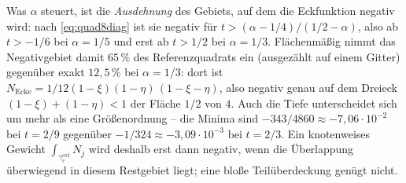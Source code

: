 \documentclass[a4paper,11pt]{article}
\def\tfrac#1#2{#1/#2}%
\def\tilde#1{#1}%
\begin{document}
Was $\alpha$ steuert, ist die \emph{Ausdehnung} des Gebiets, auf dem die Eckfunktion negativ wird:
nach \eqref{eq:quad8diag} ist sie negativ für $t>(\alpha-\tfrac14)/(\tfrac12-\alpha)$, also ab
$t>-\tfrac16$ bei $\alpha=\tfrac15$ und erst ab $t>\tfrac12$ bei $\alpha=\tfrac13$. Flächenmäßig
nimmt das Negativgebiet damit $65\,\%$ des Referenzquadrats ein (ausgezählt auf einem Gitter)
gegenüber exakt $12{,}5\,\%$ bei $\alpha=\tfrac13$: dort ist
$\tilde N_{\text{Ecke}}=\tfrac{1}{12}(1-\xi)(1-\eta)\,(1-\xi-\eta)$, also negativ genau auf dem
Dreieck $(1-\xi)+(1-\eta)<1$ der Fläche $\tfrac12$ von $4$. Auch die Tiefe unterscheidet sich um mehr als eine
Größenordnung -- die Minima sind $-\tfrac{343}{4860}\approx-7{,}06\cdot10^{-2}$ bei $t=\tfrac29$
gegenüber $-\tfrac{1}{324}\approx-3{,}09\cdot10^{-3}$ bei $t=\tfrac23$. Ein knotenweises Gewicht
$\int_{\gamma_c^{\text{ovl}}}\tilde N_j$ wird deshalb erst dann negativ, wenn die Überlappung
überwiegend in diesem Restgebiet liegt; eine bloße Teilüberdeckung genügt nicht.
\end{document}
